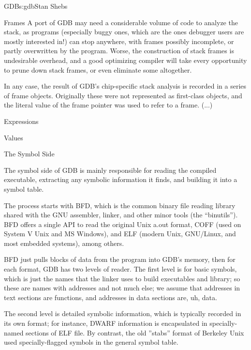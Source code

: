 \begin{aosachapter}{GDB}{s:gdb}{Stan Shebs}
\begin{aosasect1}{Frames}
A port of GDB may need a considerable volume of code to analyze the
stack, as programs (especially buggy ones, which are the ones debugger
users are mostly interested in!) can stop anywhere, with frames possibly
incomplete, or partly overwritten by the program.  Worse, the construction
of stack frames is undesirable overhead, and a good optimizing compiler
will take every opportunity to prune down stack frames, or even eliminate
some altogether.

In any case, the result of GDB's chip-specific stack analysis is recorded
in a series of frame objects.  Originally these were not represented as
first-class objects, and the literal value of the frame pointer was used
to refer to a frame. (...)

\end{aosasect1}

\begin{aosasect1}{Expressions}

\end{aosasect1}

\begin{aosasect1}{Values}

\end{aosasect1}

\begin{aosasect1}{The Symbol Side}

The symbol side of GDB is mainly responsible for reading the compiled
executable, extracting any symbolic information it finds, and building
it into a symbol table.

The process starts with BFD, which is the common binary file reading
library shared with the GNU assembler, linker, and other minor tools
(the ``binutils'').  BFD offers a single API to read the original Unix
a.out format, COFF (used on System V Unix and MS Windows), and ELF
(modern Unix, GNU/Linux, and most embedded systems), among others.

BFD just pulls blocks of data from the program into GDB's memory, then
for each format, GDB has two levels of reader.  The first level is for
basic symbols, which is just the names that the linker uses to build
executables and library; so these are names with addresses and not
much else; we assume that addresses in text sections are functions,
and addresses in data sections are, uh, data.

The second level is detailed symbolic information, which is typically
recorded in its own format; for instance, DWARF information is
encapsulated in specially-named sections of ELF file.  By contrast,
the old ''stabs'' format of Berkeley Unix used specially-flagged
symbols in the general symbol table.


\end{aosasect1}
\end{aosachapter}

